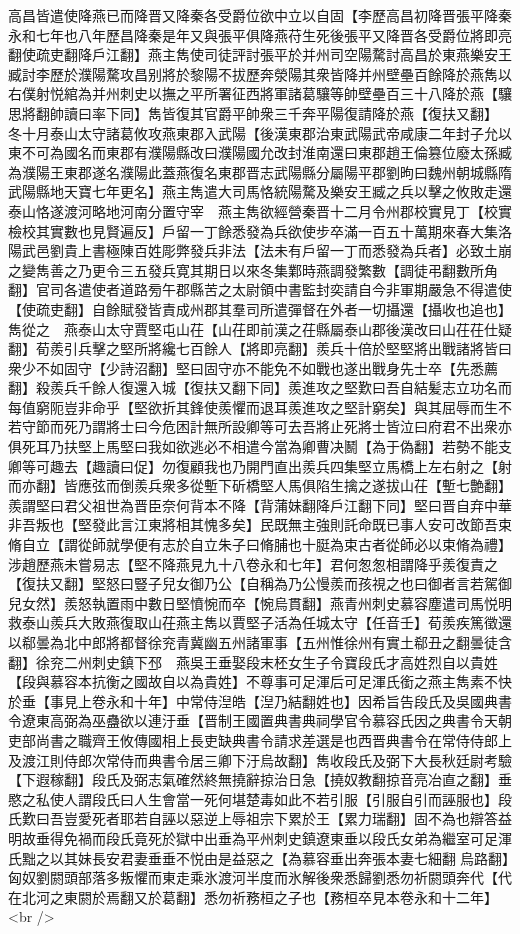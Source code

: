 高昌皆遣使降燕已而降晋又降秦各受爵位欲中立以自固【李歷高昌初降晋張平降秦永和七年也八年歷昌降秦是年又與張平俱降燕苻生死後張平又降晋各受爵位將即亮翻使疏吏翻降戶江翻】燕主雋使司徒評討張平於并州司空陽騖討高昌於東燕樂安王臧討李歷於濮陽騖攻昌别將於黎陽不拔歷奔滎陽其衆皆降并州壁壘百餘降於燕雋以右僕射悦綰為并州刺史以撫之平所署征西將軍諸葛驤等帥壁壘百三十八降於燕【驤思將翻帥讀曰率下同】雋皆復其官爵平帥衆三千奔平陽復請降於燕【復扶又翻】　冬十月泰山太守諸葛攸攻燕東郡入武陽【後漢東郡治東武陽武帝咸康二年封子允以東不可為國名而東郡有濮陽縣改曰濮陽國允改封淮南還曰東郡趙王倫篡位廢太孫臧為濮陽王東郡遂名濮陽此蓋燕復名東郡晋志武陽縣分屬陽平郡劉昫曰魏州朝城縣隋武陽縣地天寶七年更名】燕主雋遣大司馬恪統陽騖及樂安王臧之兵以擊之攸敗走還泰山恪遂渡河略地河南分置守宰　燕主雋欲經營秦晋十二月令州郡校實見丁【校實檢校其實數也見賢遍反】戶留一丁餘悉發為兵欲使步卒滿一百五十萬期來春大集洛陽武邑劉貴上書極陳百姓彫弊發兵非法【法未有戶留一丁而悉發為兵者】必致土崩之變雋善之乃更令三五發兵寛其期日以來冬集鄴時燕調發繁數【調徒弔翻數所角翻】官司各遣使者道路㫄午郡縣苦之太尉領中書監封奕請自今非軍期嚴急不得遣使【使疏吏翻】自餘賦發皆責成州郡其羣司所遣彈督在外者一切攝還【攝收也追也】雋從之　燕泰山太守賈堅屯山茌【山茌即前漢之茌縣屬泰山郡後漢改曰山茌茌仕疑翻】荀羨引兵擊之堅所將纔七百餘人【將即亮翻】羨兵十倍於堅堅將出戰諸將皆曰衆少不如固守【少詩沼翻】堅曰固守亦不能免不如戰也遂出戰身先士卒【先悉薦翻】殺羨兵千餘人復還入城【復扶又翻下同】羨進攻之堅歎曰吾自結髪志立功名而每值窮阨豈非命乎【堅欲折其鋒使羨懼而退耳羨進攻之堅計窮矣】與其屈辱而生不若守節而死乃謂將士曰今危困計無所設卿等可去吾將止死將士皆泣曰府君不出衆亦俱死耳乃扶堅上馬堅曰我如欲逃必不相遣今當為卿曹决鬭【為于偽翻】若勢不能支卿等可趣去【趣讀曰促】勿復顧我也乃開門直出羨兵四集堅立馬橋上左右射之【射而亦翻】皆應弦而倒羨兵衆多從塹下斫橋堅人馬俱陷生擒之遂拔山茌【塹七艶翻】羨謂堅曰君父祖世為晋臣奈何背本不降【背蒲妹翻降戶江翻下同】堅曰晋自弃中華非吾叛也【堅發此言江東將相其愧多矣】民既無主強則託命既已事人安可改節吾束脩自立【謂從師就學便有志於自立朱子曰脩脯也十脡為束古者從師必以束脩為禮】涉趙歷燕未嘗易志【堅不降燕見九十八卷永和七年】君何怱怱相謂降乎羨復責之【復扶又翻】堅怒曰豎子兒女御乃公【自稱為乃公慢羨而孩視之也曰御者言若駕御兒女然】羨怒執置雨中數日堅憤惋而卒【惋烏貫翻】燕青州刺史慕容塵遣司馬悦明救泰山羨兵大敗燕復取山茌燕主雋以賈堅子活為任城太守【任音壬】荀羨疾篤徵還以郗曇為北中郎將都督徐兖青冀幽五州諸軍事【五州惟徐州有實土郗丑之翻曇徒含翻】徐兖二州刺史鎮下邳　燕吳王垂娶段末柸女生子令寶段氏才高姓烈自以貴姓【段與慕容本抗衡之國故自以為貴姓】不尊事可足渾后可足渾氏銜之燕主雋素不快於垂【事見上卷永和十年】中常侍湼皓【湼乃結翻姓也】因希旨告段氏及吳國典書令遼東高弼為巫蠱欲以連汙垂【晋制王國置典書典祠學官令慕容氏因之典書令天朝吏部尚書之職齊王攸傳國相上長吏缺典書令請求差選是也西晋典書令在常侍侍郎上及渡江則侍郎次常侍而典書令居三卿下汙烏故翻】雋收段氏及弼下大長秋廷尉考驗【下遐稼翻】段氏及弼志氣確然終無撓辭掠治日急【撓奴教翻掠音亮冶直之翻】垂愍之私使人謂段氏曰人生會當一死何堪楚毒如此不若引服【引服自引而誣服也】段氏歎曰吾豈愛死者耶若自誣以惡逆上辱祖宗下累於王【累力瑞翻】固不為也辯答益明故垂得免禍而段氏竟死於獄中出垂為平州刺史鎮遼東垂以段氏女弟為繼室可足渾氏黜之以其妹長安君妻垂垂不悦由是益惡之【為慕容垂出奔張本妻七細翻烏路翻】　匈奴劉閼頭部落多叛懼而東走乘氷渡河半度而氷解後衆悉歸劉悉勿祈閼頭奔代【代在北河之東閼於焉翻又於葛翻】悉勿祈務桓之子也【務桓卒見本卷永和十二年】<br />
